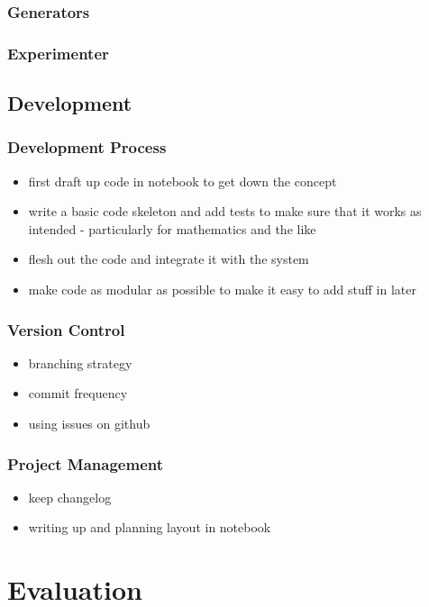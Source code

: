 \documentclass[a4paper,11pt]{article}
\begin{document}
\subsubsection{Generators}
\label{sec-6-1-3}
\subsubsection{Experimenter}
\label{sec-6-1-4}
\subsection{Development}
\label{sec-6-2}
\subsubsection{Development Process}
\label{sec-6-2-1}

\begin{itemize}
\item first draft up code in notebook to get down the concept
\item write a basic code skeleton and add tests to make sure that it works as
  intended - particularly for mathematics and the like
\item flesh out the code and integrate it with the system
\item make code as modular as possible to make it easy to add stuff in later
\end{itemize}
\subsubsection{Version Control}
\label{sec-6-2-2}

\begin{itemize}
\item branching strategy
\item commit frequency
\item using issues on github
\end{itemize}
\subsubsection{Project Management}
\label{sec-6-2-3}

\begin{itemize}
\item keep changelog
\item writing up and planning layout in notebook
\end{itemize}
\section{Evaluation}
\label{sec-7}
\end{document}
